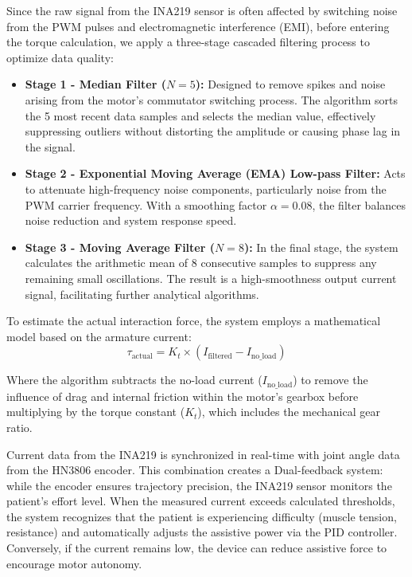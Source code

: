 \documentclass[conference]{IEEEtran}
\begin{document}
Since the raw signal from the INA219 sensor is often affected by switching noise from the PWM pulses and electromagnetic interference (EMI), before entering the torque calculation, we apply a three-stage cascaded filtering process to optimize data quality:
\begin{itemize}
    \item \textbf{Stage 1 - Median Filter ($N=5$):} Designed to remove spikes and noise arising from the motor's commutator switching process. The algorithm sorts the 5 most recent data samples and selects the median value, effectively suppressing outliers without distorting the amplitude or causing phase lag in the signal.
    \item \textbf{Stage 2 - Exponential Moving Average (EMA) Low-pass Filter:} Acts to attenuate high-frequency noise components, particularly noise from the PWM carrier frequency. With a smoothing factor $\alpha=0.08$, the filter balances noise reduction and system response speed.
    \item \textbf{Stage 3 - Moving Average Filter ($N=8$):} In the final stage, the system calculates the arithmetic mean of 8 consecutive samples to suppress any remaining small oscillations. The result is a high-smoothness output current signal, facilitating further analytical algorithms.
\end{itemize}

To estimate the actual interaction force, the system employs a mathematical model based on the armature current:
\begin{equation}
\tau_{\text{actual}} = K_t \times (I_{\text{filtered}} - I_{\text{no\_load}})
\label{eq:torque_estimation}
\end{equation}

Where the algorithm subtracts the no-load current ($I_{\text{no\_load}}$) to remove the influence of drag and internal friction within the motor's gearbox before multiplying by the torque constant ($K_t$), which includes the mechanical gear ratio.

Current data from the INA219 is synchronized in real-time with joint angle data from the HN3806 encoder. This combination creates a Dual-feedback system: while the encoder ensures trajectory precision, the INA219 sensor monitors the patient's effort level. When the measured current exceeds calculated thresholds, the system recognizes that the patient is experiencing difficulty (muscle tension, resistance) and automatically adjusts the assistive power via the PID controller. Conversely, if the current remains low, the device can reduce assistive force to encourage motor autonomy.
\end{document}
